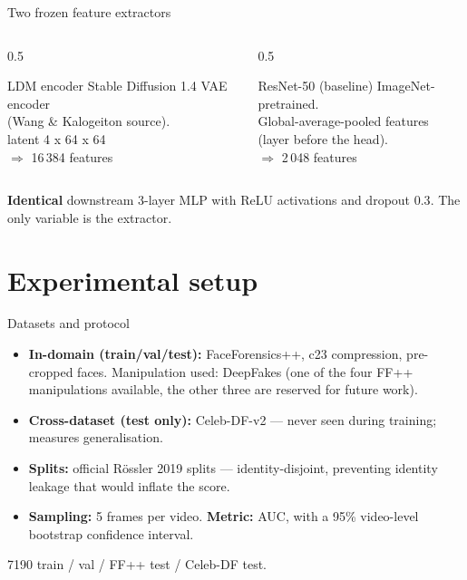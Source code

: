 \documentclass[aspectratio=169,11pt]{beamer}
\begin{document}
\begin{frame}{Two frozen feature extractors}
  \begin{columns}[T]
    \begin{column}{0.5\textwidth}
      \begin{block}{LDM encoder}
        Stable Diffusion 1.4 VAE encoder \\
        (Wang \& Kalogeiton source). \\[2mm]
        latent 4 x 64 x 64 \\
        $\Rightarrow$ 16\,384 features
      \end{block}
    \end{column}
    \begin{column}{0.5\textwidth}
      \begin{block}{ResNet-50 (baseline)}
        ImageNet-pretrained. \\
        Global-average-pooled features \\
        (layer before the head). \\[2mm]
        $\Rightarrow$ 2\,048 features
      \end{block}
    \end{column}
  \end{columns}
  \medskip
  \textbf{Identical} downstream 3-layer MLP with ReLU activations and
  dropout $0.3$. The only variable is the extractor.
\end{frame}

\section{Experimental setup}

\begin{frame}{Datasets and protocol}
  \begin{itemize}
    \item \textbf{In-domain (train/val/test):} FaceForensics++, c23
          compression, pre-cropped faces. \alert{Manipulation used:
          DeepFakes} (one of the four FF++ manipulations available, the
          other three are reserved for future work).
    \item \textbf{Cross-dataset (test only):} Celeb-DF-v2 --- never seen
          during training; measures generalisation.
    \item \textbf{Splits:} official Rössler 2019 splits ---
          \alert{identity-disjoint}, preventing identity leakage that would
          inflate the score.
    \item \textbf{Sampling:} 5 frames per video. \textbf{Metric:} AUC, with
          a 95\% video-level bootstrap confidence interval.
  \end{itemize}
  \medskip
  \centering
  \footnotesize
  7190 train \;/ val \;/ FF++ test \;/ Celeb-DF test.
\end{frame}
\end{document}
